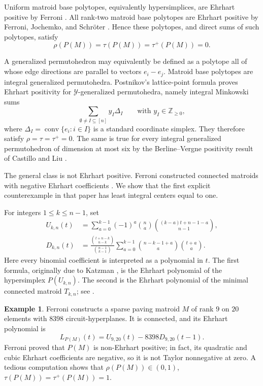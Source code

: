 \documentclass[reqno, 12pt]{article}
\numberwithin{equation}{section}
\theoremstyle{definition}
\newtheorem{example}[theorem]{Example}
\newcommand{\Z}{\mathbb{Z}}
\newcommand{\conv}{\operatorname{conv}}
\begin{document}
Uniform matroid base polytopes, equivalently hypersimplices, are Ehrhart positive by Ferroni \cite{Ferroni2021Hypersimplices}.  All rank-two matroid base polytopes are Ehrhart positive by Ferroni, Jochemko, and Schr\"oter \cite{FerroniJochemkoSchroeter2022}.  Hence these polytopes, and direct sums of such polytopes, satisfy
\[\rho(P(M))=\tau(P(M))=\tau^+(P(M))=0.
\]

A generalized permutohedron may equivalently be defined as a polytope all of whose edge directions are parallel to vectors $e_i-e_j$. Matroid base polytopes are integral generalized permutohedra.  Postnikov's lattice-point formula \cite[Theorem~11.3]{Postnikov2009} proves Ehrhart positivity for $\mathcal Y$-generalized permutohedra, namely integral
Minkowski sums
\[\sum_{\emptyset \neq I\subseteq[n]}y_I\Delta_I\qquad\text{with }y_I\in\Z_{\geq0},
\]
where $\Delta_I=\conv\{e_i:i\in I\}$ is a standard coordinate simplex.
They therefore satisfy $\rho=\tau=\tau^+=0$.  The same is true for every integral generalized
permutohedron of dimension at most six by the Berline--Vergne positivity result of Castillo and Liu \cite{CastilloLiu2018}.

The general class is not Ehrhart positive.  Ferroni constructed connected matroids with negative Ehrhart coefficients \cite{Ferroni2022Matroids}. We show that the first explicit counterexample in that paper has least
integral centers equal to one.

For integers $1\leq k\leq n-1$, set
\begin{align*}
 U_{k,n}(t)&=\sum_{a=0}^{k-1}(-1)^a\binom{n}{a}\binom{(k-a)t+n-1-a}{n-1},\\
 D_{k,n}(t)&=\frac{\binom{t+n-k}{n-k}}{\binom{n-1}{k-1}}\sum_{a=0}^{k-1}\binom{n-k-1+a}{a}\binom{t+a}{a}.
\end{align*}
Here every binomial coefficient is interpreted as a polynomial in $t$.
The first formula, originally due to Katzman \cite[Corollary~2.2]{Katzman2005}, is the Ehrhart polynomial of the
hypersimplex $P(U_{k,n})$. The second is the Ehrhart polynomial of the minimal connected matroid $T_{k,n}$; see
\cite{Ferroni2022Minimal,Ferroni2022Matroids}.


\begin{example}\label{thm:natural-matroid-center}
Ferroni \cite[Theorem~5.3]{Ferroni2022Matroids} constructs a sparse paving matroid $M$ of rank $9$ on $20$ elements with $8398$
circuit-hyperplanes.  It is connected, and its Ehrhart polynomial is
\begin{equation*}
 L_{P(M)}(t)=U_{9,20}(t)-8398D_{9,20}(t-1).
\end{equation*}
Ferroni proved that $P(M)$ is non-Ehrhart positive; in fact, its quadratic and cubic Ehrhart coefficients are negative, so it is not Taylor nonnegative at zero.
A tedious computation shows that $\rho(P(M))\in(0,1)$, $\tau(P(M))=\tau^+(P(M))=1$.
\end{example}
\end{document}
